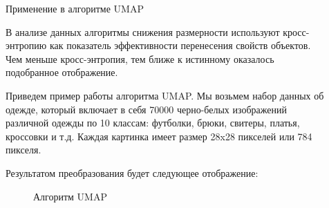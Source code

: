 \documentclass[final]{beamer}
\newlength{\sepwid}
\newlength{\onecolwid}
\newlength{\twocolwid}
\begin{document}
\begin{frame}[t]
\begin{columns}[t]
\begin{column}{\twocolwid}
\begin{columns}[t,totalwidth=\twocolwid]
\begin{column}{\onecolwid}




\end{column} %

\end{columns} %

\end{column} %

\begin{column}{\sepwid}\end{column} %

\begin{column}{\onecolwid} %

\begin{block}{Применение в алгоритме UMAP}
	
	В анализе данных алгоритмы снижения размерности используют кросс-энтропию как показатель эффективности перенесения свойств объектов. Чем меньше кросс-энтропия, тем ближе к истинному оказалось подобранное отображение.

Приведем пример работы алгоритма UMAP. Мы возьмем набор данных об одежде, который включает в себя 70000 черно-белых изображений различной одежды по 10 классам: футболки, брюки, свитеры, платья, кроссовки и т.д. Каждая картинка имеет размер 28x28 пикселей или 784 пикселя.

Результатом преобразования будет следующее отображение:

\begin{figure}[!h]
	\noindent{}
	\caption{Алгоритм UMAP}
	\label{figCurves}
\end{figure} 


\end{block}
\end{column}
\end{columns}
\end{frame}
\end{document}
